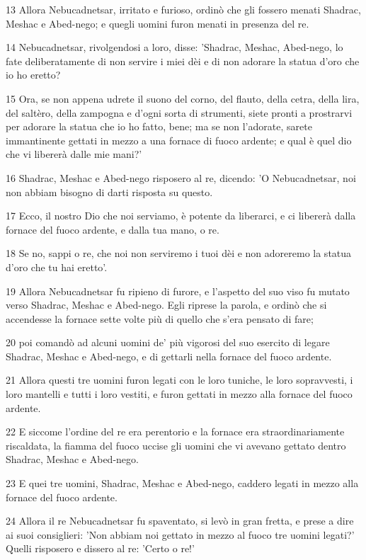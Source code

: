 \par 13 Allora Nebucadnetsar, irritato e furioso, ordinò che gli fossero menati Shadrac, Meshac e Abed-nego; e quegli uomini furon menati in presenza del re.
\par 14 Nebucadnetsar, rivolgendosi a loro, disse: 'Shadrac, Meshac, Abed-nego, lo fate deliberatamente di non servire i miei dèi e di non adorare la statua d'oro che io ho eretto?
\par 15 Ora, se non appena udrete il suono del corno, del flauto, della cetra, della lira, del saltèro, della zampogna e d'ogni sorta di strumenti, siete pronti a prostrarvi per adorare la statua che io ho fatto, bene; ma se non l'adorate, sarete immantinente gettati in mezzo a una fornace di fuoco ardente; e qual è quel dio che vi libererà dalle mie mani?'
\par 16 Shadrac, Meshac e Abed-nego risposero al re, dicendo: 'O Nebucadnetsar, noi non abbiam bisogno di darti risposta su questo.
\par 17 Ecco, il nostro Dio che noi serviamo, è potente da liberarci, e ci libererà dalla fornace del fuoco ardente, e dalla tua mano, o re.
\par 18 Se no, sappi o re, che noi non serviremo i tuoi dèi e non adoreremo la statua d'oro che tu hai eretto'.
\par 19 Allora Nebucadnetsar fu ripieno di furore, e l'aspetto del suo viso fu mutato verso Shadrac, Meshac e Abed-nego. Egli riprese la parola, e ordinò che si accendesse la fornace sette volte più di quello che s'era pensato di fare;
\par 20 poi comandò ad alcuni uomini de' più vigorosi del suo esercito di legare Shadrac, Meshac e Abed-nego, e di gettarli nella fornace del fuoco ardente.
\par 21 Allora questi tre uomini furon legati con le loro tuniche, le loro sopravvesti, i loro mantelli e tutti i loro vestiti, e furon gettati in mezzo alla fornace del fuoco ardente.
\par 22 E siccome l'ordine del re era perentorio e la fornace era straordinariamente riscaldata, la fiamma del fuoco uccise gli uomini che vi avevano gettato dentro Shadrac, Meshac e Abed-nego.
\par 23 E quei tre uomini, Shadrac, Meshac e Abed-nego, caddero legati in mezzo alla fornace del fuoco ardente.
\par 24 Allora il re Nebucadnetsar fu spaventato, si levò in gran fretta, e prese a dire ai suoi consiglieri: 'Non abbiam noi gettato in mezzo al fuoco tre uomini legati?' Quelli risposero e dissero al re: 'Certo o re!'
